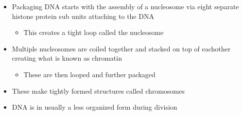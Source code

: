 \documentclass[letterpaper]{article}
\begin{document}
\begin{itemize}
\item Packaging DNA starts with the assembly of a nucleosome via eight
separate histone protein sub units attaching to the DNA

\begin{itemize}
\item This creates a tight loop called the nucleosome
\end{itemize}

\item Multiple nucleosomes are coiled together and stacked on top of
eachother creating what is known as chromatin

\begin{itemize}
\item These are then looped and further packaged
\end{itemize}

\item These make tightly formed structures called chromosomes
\item DNA is in usually a less organized form during division
\end{itemize}
\end{document}
